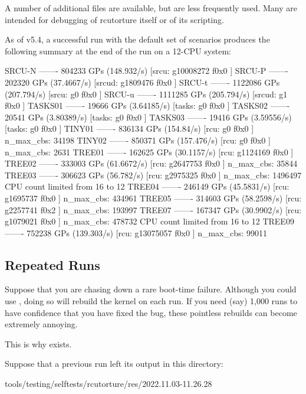 A number of additional files are available, but are less frequently used.
Many are intended for debugging of rcutorture itself or of its scripting.

As of v5.4, a successful run with the default set of scenarios produces
the following summary at the end of the run on a 12-CPU system:

\begin{VerbatimU}[gobble=4,xleftmargin=1pt,xrightmargin=1pt]
    SRCU-N ------- 804233 GPs (148.932/s) [srcu: g10008272 f0x0 ]
    SRCU-P ------- 202320 GPs (37.4667/s) [srcud: g1809476 f0x0 ]
    SRCU-t ------- 1122086 GPs (207.794/s) [srcu: g0 f0x0 ]
    SRCU-u ------- 1111285 GPs (205.794/s) [srcud: g1 f0x0 ]
    TASKS01 ------- 19666 GPs (3.64185/s) [tasks: g0 f0x0 ]
    TASKS02 ------- 20541 GPs (3.80389/s) [tasks: g0 f0x0 ]
    TASKS03 ------- 19416 GPs (3.59556/s) [tasks: g0 f0x0 ]
    TINY01 ------- 836134 GPs (154.84/s) [rcu: g0 f0x0 ] n_max_cbs: 34198
    TINY02 ------- 850371 GPs (157.476/s) [rcu: g0 f0x0 ] n_max_cbs: 2631
    TREE01 ------- 162625 GPs (30.1157/s) [rcu: g1124169 f0x0 ]
    TREE02 ------- 333003 GPs (61.6672/s) [rcu: g2647753 f0x0 ] n_max_cbs: 35844
    TREE03 ------- 306623 GPs (56.782/s) [rcu: g2975325 f0x0 ] n_max_cbs: 1496497
    CPU count limited from 16 to 12
    TREE04 ------- 246149 GPs (45.5831/s) [rcu: g1695737 f0x0 ] n_max_cbs: 434961
    TREE05 ------- 314603 GPs (58.2598/s) [rcu: g2257741 f0x2 ] n_max_cbs: 193997
    TREE07 ------- 167347 GPs (30.9902/s) [rcu: g1079021 f0x0 ] n_max_cbs: 478732
    CPU count limited from 16 to 12
    TREE09 ------- 752238 GPs (139.303/s) [rcu: g13075057 f0x0 ] n_max_cbs: 99011
\end{VerbatimU}


\subsection{Repeated Runs}

Suppose that you are chasing down a rare boot-time failure.
Although you
could use , doing so will rebuild the kernel on each run.
If you
need (say) 1,000 runs to have confidence that you have fixed the bug,
these pointless rebuilds can become extremely annoying.

This is why  exists.

Suppose that a previous  run left its output in this directory:

\begin{VerbatimU}
	tools/testing/selftests/rcutorture/res/2022.11.03-11.26.28
\end{VerbatimU}

